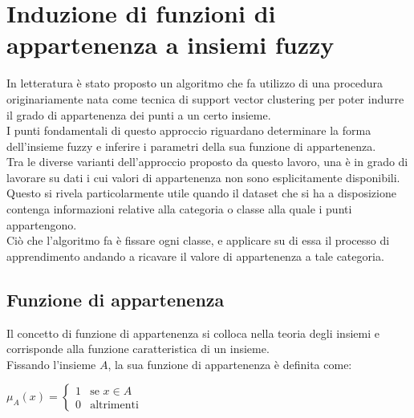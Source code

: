\documentclass[12pt]{report}
\theoremstyle{definition}
\begin{document}
\section{Induzione di funzioni di appartenenza a insiemi fuzzy} \label{induzione}
In letteratura è stato proposto un algoritmo \cite{1} che fa utilizzo di una procedura originariamente nata come tecnica di support vector clustering \cite{23} per poter indurre il grado di appartenenza dei punti a un certo insieme.
\\
I punti fondamentali di questo approccio riguardano determinare la forma dell'insieme fuzzy e inferire i parametri della sua funzione di appartenenza.
\\
Tra le diverse varianti dell'approccio proposto da questo lavoro, una è in grado di lavorare su dati i cui valori di appartenenza non sono esplicitamente disponibili.
\\
Questo si rivela particolarmente utile quando il dataset che si ha a disposizione contenga informazioni relative alla categoria o classe alla quale i punti appartengono.
\\
Ciò che l'algoritmo fa è fissare ogni classe, e applicare su di essa il processo di apprendimento andando a ricavare il valore di appartenenza a tale categoria.

\subsection{Funzione di appartenenza} \label{membership}
Il concetto di funzione di appartenenza si colloca nella teoria degli insiemi e corrisponde alla funzione caratteristica di un insieme.
\\
Fissando l'insieme $A$, la sua funzione di appartenenza è definita come:
\begin{center}
    $\mu_A(x)= \begin{cases} 1 & \mbox{se } x \in A \\ 0 & \mbox{altrimenti} \end{cases}$
\end{center}
\end{document}
